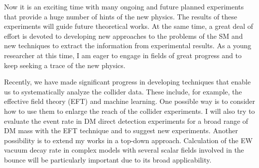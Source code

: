 \documentclass[12pt,notitlepage]{article}
\begin{document}

Now it is an exciting time with many ongoing and future planned experiments that provide a huge number of hints of the new physics.
The results of these experiments will guide future theoretical works.
At the same time, a great deal of effort is devoted to developing new approaches to the problems of the SM and new techniques to extract the information from experimental results.
As a young researcher at this time, I am eager to engage in fields of great progress and to keep seeking a trace of the new physics.

Recently, we have made significant progress in developing techniques that enable us to systematically analyze the collider data.
These include, for example, the effective field theory (EFT) and machine learning.
One possible way is to consider how to use them to enlarge the reach of the collider experiments.
I will also try to evaluate the event rate in DM direct detection experiments for a broad range of DM mass with the EFT technique and to suggest new experiments.
Another possibility is to extend my works in a top-down approach.
Calculation of the EW vacuum decay rate in complex models with several scalar fields involved in the bounce will be particularly important due to its broad applicability.
\end{document}
